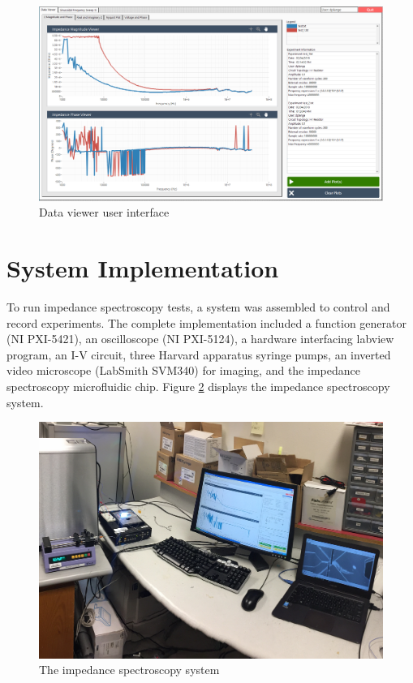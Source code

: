 \begin{figure}[h]
    \centering
    \includegraphics[width=\textwidth]{images/labview_dataViewer.png}
    \caption{Data viewer user interface}
    \label{fig:labview_data_viewer_gui}
\end{figure}

\section{System Implementation}
\par To run impedance spectroscopy tests, a system was assembled to control and record experiments. The complete implementation included a function generator (NI PXI-5421), an oscilloscope (NI PXI-5124), a hardware interfacing labview program, an I-V circuit, three Harvard apparatus syringe pumps, an inverted video microscope (LabSmith SVM340) for imaging, and the impedance spectroscopy microfluidic chip. Figure \ref{fig:IS_system} displays the impedance spectroscopy system. 

\begin{figure}[h]
    \centering
    \includegraphics[width=\textwidth]{images/impedance_system}
    \caption{The impedance spectroscopy system}
    \label{fig:IS_system}
\end{figure}

